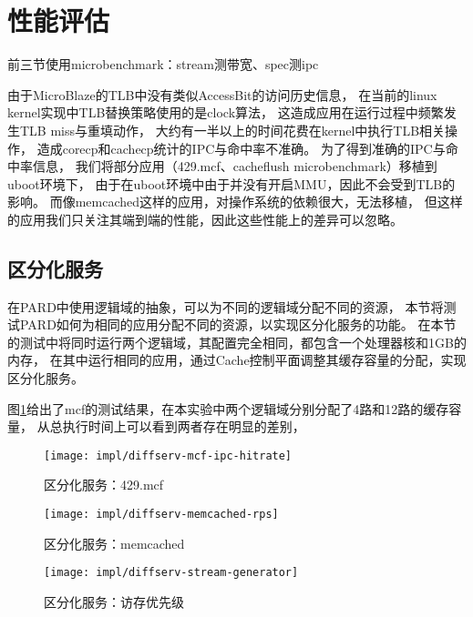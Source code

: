 \section{性能评估}

前三节使用microbenchmark：stream测带宽、spec测ipc

由于MicroBlaze的TLB中没有类似AccessBit的访问历史信息，
在当前的linux kernel实现中TLB替换策略使用的是clock算法，
这造成应用在运行过程中频繁发生TLB miss与重填动作，
大约有一半以上的时间花费在kernel中执行TLB相关操作，
造成corecp和cachecp统计的IPC与命中率不准确。
为了得到准确的IPC与命中率信息，
我们将部分应用（429.mcf、cacheflush microbenchmark）移植到uboot环境下，
由于在uboot环境中由于并没有开启MMU，因此不会受到TLB的影响。
而像memcached这样的应用，对操作系统的依赖很大，无法移植，
但这样的应用我们只关注其端到端的性能，因此这些性能上的差异可以忽略。


\subsection{区分化服务}

在PARD中使用逻辑域的抽象，可以为不同的逻辑域分配不同的资源，
本节将测试PARD如何为相同的应用分配不同的资源，以实现区分化服务的功能。
在本节的测试中将同时运行两个逻辑域，其配置完全相同，都包含一个处理器核和1GB的内存，
在其中运行相同的应用，通过Cache控制平面调整其缓存容量的分配，实现区分化服务。

图\ref{fig:diffserv-mcf-ipc-hitrate}给出了mcf的测试结果，在本实验中两个逻辑域分别分配了4路和12路的缓存容量，
从总执行时间上可以看到两者存在明显的差别，

\begin{figure}[tb]
  \centering
  \texttt{[image: impl/diffserv-mcf-ipc-hitrate]}
  \caption{区分化服务：429.mcf}
  \label{fig:diffserv-mcf-ipc-hitrate}
\end{figure}

\begin{figure}[tb]
\begin{minipage}[b]{0.48\textwidth}
  \centering
  \texttt{[image: impl/diffserv-memcached-rps]}
  \caption{区分化服务：memcached}
  \label{fig:diffserv-memcached-rps}
\end{minipage}\hfill
\begin{minipage}[b]{0.48\textwidth}
  \centering
  \texttt{[image: impl/diffserv-stream-generator]}
  \caption{区分化服务：访存优先级}
  \label{fig:diffserv-stream-generator}
\end{minipage}
\end{figure}


